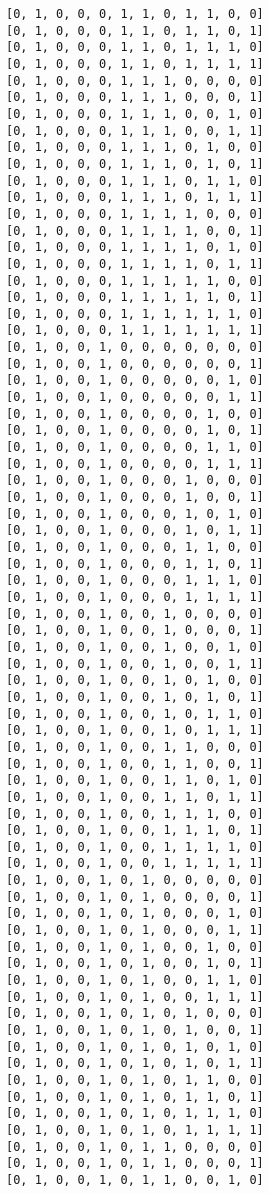 \documentclass[11pt]{article}
\begin{document}
\begin{Verbatim}[commandchars=\\\{\}]
[0, 1, 0, 0, 0, 1, 1, 0, 1, 1, 0, 0]
[0, 1, 0, 0, 0, 1, 1, 0, 1, 1, 0, 1]
[0, 1, 0, 0, 0, 1, 1, 0, 1, 1, 1, 0]
[0, 1, 0, 0, 0, 1, 1, 0, 1, 1, 1, 1]
[0, 1, 0, 0, 0, 1, 1, 1, 0, 0, 0, 0]
[0, 1, 0, 0, 0, 1, 1, 1, 0, 0, 0, 1]
[0, 1, 0, 0, 0, 1, 1, 1, 0, 0, 1, 0]
[0, 1, 0, 0, 0, 1, 1, 1, 0, 0, 1, 1]
[0, 1, 0, 0, 0, 1, 1, 1, 0, 1, 0, 0]
[0, 1, 0, 0, 0, 1, 1, 1, 0, 1, 0, 1]
[0, 1, 0, 0, 0, 1, 1, 1, 0, 1, 1, 0]
[0, 1, 0, 0, 0, 1, 1, 1, 0, 1, 1, 1]
[0, 1, 0, 0, 0, 1, 1, 1, 1, 0, 0, 0]
[0, 1, 0, 0, 0, 1, 1, 1, 1, 0, 0, 1]
[0, 1, 0, 0, 0, 1, 1, 1, 1, 0, 1, 0]
[0, 1, 0, 0, 0, 1, 1, 1, 1, 0, 1, 1]
[0, 1, 0, 0, 0, 1, 1, 1, 1, 1, 0, 0]
[0, 1, 0, 0, 0, 1, 1, 1, 1, 1, 0, 1]
[0, 1, 0, 0, 0, 1, 1, 1, 1, 1, 1, 0]
[0, 1, 0, 0, 0, 1, 1, 1, 1, 1, 1, 1]
[0, 1, 0, 0, 1, 0, 0, 0, 0, 0, 0, 0]
[0, 1, 0, 0, 1, 0, 0, 0, 0, 0, 0, 1]
[0, 1, 0, 0, 1, 0, 0, 0, 0, 0, 1, 0]
[0, 1, 0, 0, 1, 0, 0, 0, 0, 0, 1, 1]
[0, 1, 0, 0, 1, 0, 0, 0, 0, 1, 0, 0]
[0, 1, 0, 0, 1, 0, 0, 0, 0, 1, 0, 1]
[0, 1, 0, 0, 1, 0, 0, 0, 0, 1, 1, 0]
[0, 1, 0, 0, 1, 0, 0, 0, 0, 1, 1, 1]
[0, 1, 0, 0, 1, 0, 0, 0, 1, 0, 0, 0]
[0, 1, 0, 0, 1, 0, 0, 0, 1, 0, 0, 1]
[0, 1, 0, 0, 1, 0, 0, 0, 1, 0, 1, 0]
[0, 1, 0, 0, 1, 0, 0, 0, 1, 0, 1, 1]
[0, 1, 0, 0, 1, 0, 0, 0, 1, 1, 0, 0]
[0, 1, 0, 0, 1, 0, 0, 0, 1, 1, 0, 1]
[0, 1, 0, 0, 1, 0, 0, 0, 1, 1, 1, 0]
[0, 1, 0, 0, 1, 0, 0, 0, 1, 1, 1, 1]
[0, 1, 0, 0, 1, 0, 0, 1, 0, 0, 0, 0]
[0, 1, 0, 0, 1, 0, 0, 1, 0, 0, 0, 1]
[0, 1, 0, 0, 1, 0, 0, 1, 0, 0, 1, 0]
[0, 1, 0, 0, 1, 0, 0, 1, 0, 0, 1, 1]
[0, 1, 0, 0, 1, 0, 0, 1, 0, 1, 0, 0]
[0, 1, 0, 0, 1, 0, 0, 1, 0, 1, 0, 1]
[0, 1, 0, 0, 1, 0, 0, 1, 0, 1, 1, 0]
[0, 1, 0, 0, 1, 0, 0, 1, 0, 1, 1, 1]
[0, 1, 0, 0, 1, 0, 0, 1, 1, 0, 0, 0]
[0, 1, 0, 0, 1, 0, 0, 1, 1, 0, 0, 1]
[0, 1, 0, 0, 1, 0, 0, 1, 1, 0, 1, 0]
[0, 1, 0, 0, 1, 0, 0, 1, 1, 0, 1, 1]
[0, 1, 0, 0, 1, 0, 0, 1, 1, 1, 0, 0]
[0, 1, 0, 0, 1, 0, 0, 1, 1, 1, 0, 1]
[0, 1, 0, 0, 1, 0, 0, 1, 1, 1, 1, 0]
[0, 1, 0, 0, 1, 0, 0, 1, 1, 1, 1, 1]
[0, 1, 0, 0, 1, 0, 1, 0, 0, 0, 0, 0]
[0, 1, 0, 0, 1, 0, 1, 0, 0, 0, 0, 1]
[0, 1, 0, 0, 1, 0, 1, 0, 0, 0, 1, 0]
[0, 1, 0, 0, 1, 0, 1, 0, 0, 0, 1, 1]
[0, 1, 0, 0, 1, 0, 1, 0, 0, 1, 0, 0]
[0, 1, 0, 0, 1, 0, 1, 0, 0, 1, 0, 1]
[0, 1, 0, 0, 1, 0, 1, 0, 0, 1, 1, 0]
[0, 1, 0, 0, 1, 0, 1, 0, 0, 1, 1, 1]
[0, 1, 0, 0, 1, 0, 1, 0, 1, 0, 0, 0]
[0, 1, 0, 0, 1, 0, 1, 0, 1, 0, 0, 1]
[0, 1, 0, 0, 1, 0, 1, 0, 1, 0, 1, 0]
[0, 1, 0, 0, 1, 0, 1, 0, 1, 0, 1, 1]
[0, 1, 0, 0, 1, 0, 1, 0, 1, 1, 0, 0]
[0, 1, 0, 0, 1, 0, 1, 0, 1, 1, 0, 1]
[0, 1, 0, 0, 1, 0, 1, 0, 1, 1, 1, 0]
[0, 1, 0, 0, 1, 0, 1, 0, 1, 1, 1, 1]
[0, 1, 0, 0, 1, 0, 1, 1, 0, 0, 0, 0]
[0, 1, 0, 0, 1, 0, 1, 1, 0, 0, 0, 1]
[0, 1, 0, 0, 1, 0, 1, 1, 0, 0, 1, 0]

\end{Verbatim}
\end{document}
